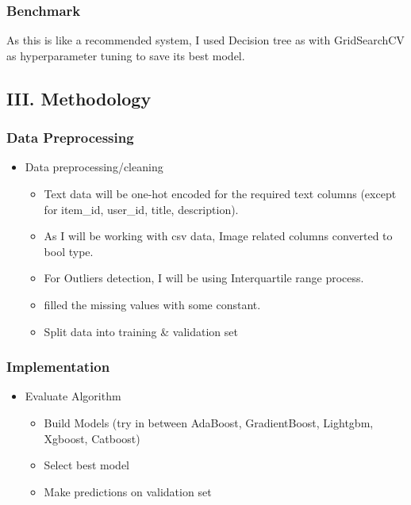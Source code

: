 \documentclass[11pt]{article}
\providecommand{\tightlist}{%
      \setlength{\itemsep}{0pt}\setlength{\parskip}{0pt}}
\begin{document}
    \subsubsection{Benchmark}\label{benchmark}

    As this is like a recommended system, I used Decision tree as with
GridSearchCV as hyperparameter tuning to save its best model.

    \subsection{III. Methodology}\label{iii.-methodology}

    \subsubsection{Data Preprocessing}\label{data-preprocessing}

    \begin{itemize}
\tightlist
\item
  Data preprocessing/cleaning

  \begin{itemize}
  \tightlist
  \item
    Text data will be one-hot encoded for the required text columns
    (except for item\_id, user\_id, title, description).
  \item
    As I will be working with csv data, Image related columns converted
    to bool type.
  \item
    For Outliers detection, I will be using Interquartile range process.
  \item
    filled the missing values with some constant.
  \item
    Split data into training \& validation set
  \end{itemize}
\end{itemize}

    \subsubsection{Implementation}\label{implementation}

    \begin{itemize}
\tightlist
\item
  Evaluate Algorithm

  \begin{itemize}
  \tightlist
  \item
    Build Models (try in between AdaBoost, GradientBoost, Lightgbm,
    Xgboost, Catboost)
  \item
    Select best model
  \item
    Make predictions on validation set
  \end{itemize}
\end{itemize}
\end{document}
